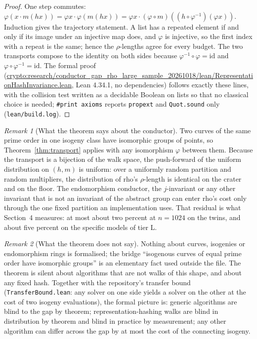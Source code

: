 \documentclass[10pt,a4paper]{article}
\newcommand{\artefact}[1]{\texttt{\small #1}}
\theoremstyle{remark}
\newtheorem{remark}{Remark}
\begin{document}
\begin{proof}
One step commutes: $\varphi(x \cdot m(h x)) = \varphi x \cdot \varphi(m(h
x)) = \varphi x \cdot (\varphi \circ m)((h \circ \varphi^{-1})(\varphi
x))$. Induction gives the trajectory statement. A list has a repeated
element if and only if its image under an injective map does, and
$\varphi$ is injective, so the first index with a repeat is the same;
hence the $\rho$-lengths agree for every budget. The two transports
compose to the identity on both sides because $\varphi^{-1} \circ \varphi
= \mathrm{id}$ and $\varphi \circ \varphi^{-1} = \mathrm{id}$.
The formal proof
(\url{crypto:research/conductor_gap_rho_large_sample_20261018/lean/RepresentationHashInvariance.lean},
Lean 4.34.1, no dependencies) follows exactly these lines, with the
collision test written as a decidable Boolean on lists so that no
classical choice is needed; \texttt{\#print axioms} reports
\texttt{propext} and \texttt{Quot.sound} only (\artefact{lean/build.log}).
\end{proof}

\begin{remark}[What the theorem says about the conductor]
Two curves of the same prime order in one isogeny class have isomorphic
groups of points, so Theorem~\ref{thm:transport} applies with any
isomorphism $\varphi$ between them. Because the transport is a bijection
of the walk space, the push-forward of the uniform distribution on
$(h, m)$ is uniform: over a uniformly random partition and random
multipliers, the distribution of rho's $\rho$-length is identical on the
crater and on the floor. The endomorphism conductor, the $j$-invariant or
any other invariant that is not an invariant of the abstract group can
enter rho's cost only through the one fixed partition an implementation
uses. That residual is what Section~4 measures: at most about two percent
at $n = 1024$ on the twins, and about five percent on the specific
models of tier L.
\end{remark}

\begin{remark}[What the theorem does not say]
Nothing about curves, isogenies or endomorphism rings is formalised; the
bridge ``isogenous curves of equal prime order have isomorphic groups''
is an elementary fact used outside the file. The theorem is silent about
algorithms that are not walks of this shape, and about any fixed hash.
Together with the repository's transfer bound
(\artefact{TransferBound.lean}: any solver on one side yields a solver on
the other at the cost of two isogeny evaluations), the formal picture is:
generic algorithms are blind to the gap by theorem; representation-hashing
walks are blind in distribution by theorem and blind in practice by
measurement; any other algorithm can differ across the gap by at most the
cost of the connecting isogeny.
\end{remark}
\end{document}
